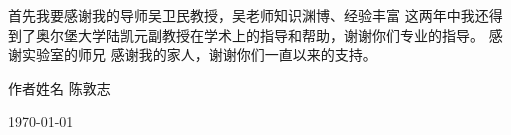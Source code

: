 首先我要感谢我的导师吴卫民教授，吴老师知识渊博、经验丰富
这两年中我还得到了奥尔堡大学陆凯元副教授在学术上的指导和帮助，谢谢你们专业的指导。
感谢实验室的师兄
感谢我的家人，谢谢你们一直以来的支持。
\begin{minipage}[t]{0.8\columnwidth}%
\begin{flushright}
作者姓名  陈敦志
\par\end{flushright}

\begin{flushright}
\today
\par\end{flushright}%
\end{minipage}

